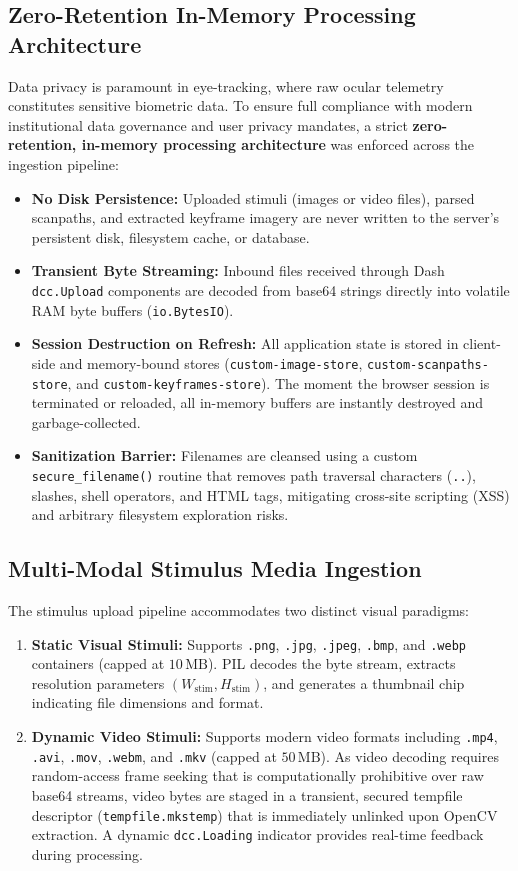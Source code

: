 \documentclass[11pt,a4paper]{article}
\begin{document}
\subsection{Zero-Retention In-Memory Processing Architecture}
Data privacy is paramount in eye-tracking, where raw ocular telemetry constitutes sensitive biometric data. To ensure full compliance with modern institutional data governance and user privacy mandates, a strict \textbf{zero-retention, in-memory processing architecture} was enforced across the ingestion pipeline:
\begin{itemize}[noitemsep,topsep=2pt]
    \item \textbf{No Disk Persistence:} Uploaded stimuli (images or video files), parsed scanpaths, and extracted keyframe imagery are never written to the server's persistent disk, filesystem cache, or database.
    \item \textbf{Transient Byte Streaming:} Inbound files received through Dash \texttt{dcc.Upload} components are decoded from base64 strings directly into volatile RAM byte buffers (\texttt{io.BytesIO}).
    \item \textbf{Session Destruction on Refresh:} All application state is stored in client-side and memory-bound stores (\texttt{custom-image-store}, \texttt{custom-scanpaths-store}, and \texttt{custom-keyframes-store}). The moment the browser session is terminated or reloaded, all in-memory buffers are instantly destroyed and garbage-collected.
    \item \textbf{Sanitization Barrier:} Filenames are cleansed using a custom \texttt{secure\_filename()} routine that removes path traversal characters (\texttt{..}), slashes, shell operators, and HTML tags, mitigating cross-site scripting (XSS) and arbitrary filesystem exploration risks.
\end{itemize}

\subsection{Multi-Modal Stimulus Media Ingestion}
The stimulus upload pipeline accommodates two distinct visual paradigms:
\begin{enumerate}
    \item \textbf{Static Visual Stimuli:} Supports \texttt{.png}, \texttt{.jpg}, \texttt{.jpeg}, \texttt{.bmp}, and \texttt{.webp} containers (capped at $10\,\text{MB}$). PIL decodes the byte stream, extracts resolution parameters $(W_{\text{stim}}, H_{\text{stim}})$, and generates a thumbnail chip indicating file dimensions and format.
    \item \textbf{Dynamic Video Stimuli:} Supports modern video formats including \texttt{.mp4}, \texttt{.avi}, \texttt{.mov}, \texttt{.webm}, and \texttt{.mkv} (capped at $50\,\text{MB}$). As video decoding requires random-access frame seeking that is computationally prohibitive over raw base64 streams, video bytes are staged in a transient, secured tempfile descriptor (\texttt{tempfile.mkstemp}) that is immediately unlinked upon OpenCV extraction. A dynamic \texttt{dcc.Loading} indicator provides real-time feedback during processing.
\end{enumerate}
\end{document}
